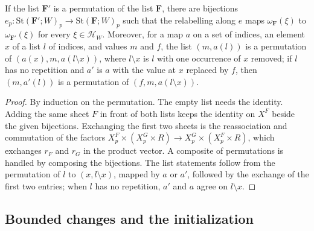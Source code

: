 \begin{theorem}
    \label{thm:party_stack_perm}
    \leanok
    If the list $\mathbf F'$ is a permutation of the list $\mathbf F$, there are bijections
    $e_p:\mathrm{St}(\mathbf F';W)_p\to\mathrm{St}(\mathbf F;W)_p$ such that the relabelling
    along $e$ maps $\omega_{\mathbf F}(\xi)$ to $\omega_{\mathbf F'}(\xi)$ for every
    $\xi\in\mathcal H_W$. Moreover, for a map $a$ on a set of indices, an element $x$ of a list
    $l$ of indices, and values $m$ and $f$, the list $(m,a(l))$ is a permutation of
    $(a(x),m,a(l\setminus x))$, where $l\setminus x$ is $l$ with one occurrence of $x$ removed;
    if $l$ has no repetition and $a'$ is $a$ with the value at $x$ replaced by $f$, then
    $(m,a'(l))$ is a permutation of $(f,m,a(l\setminus x))$.
\end{theorem}
\begin{proof}\leanok
    By induction on the permutation. The empty list needs the identity. Adding the same sheet
    $F$ in front of both lists keeps the identity on $X^F$ beside the given bijections. Exchanging
    the first two sheets is the reassociation and commutation of the factors
    $X^{F}_p\times(X^{G}_p\times R)\to X^{G}_p\times(X^{F}_p\times R)$, which exchanges $r_F$ and
    $r_G$ in the product vector. A composite of permutations is handled by composing the
    bijections. The list statements follow from the permutation of $l$ to $(x,l\setminus x)$,
    mapped by $a$ or $a'$, followed by the exchange of the first two entries; when $l$ has no
    repetition, $a'$ and $a$ agree on $l\setminus x$.
\end{proof}

\subsection{Bounded changes and the initialization}

